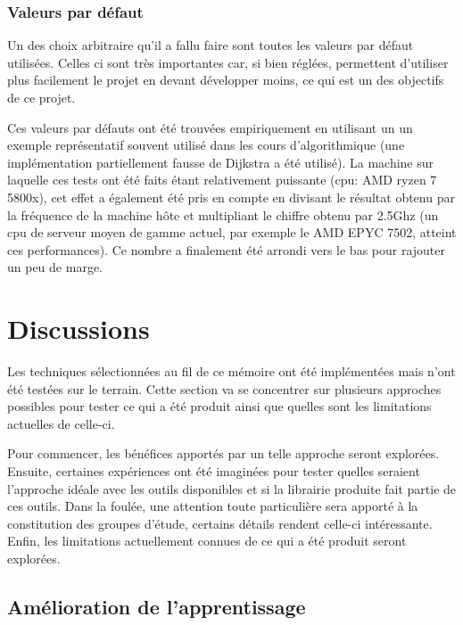 \documentclass[a4paper]{report}
\begin{document}
\subsection{Valeurs par défaut}
Un des choix arbitraire qu'il a fallu faire sont toutes les valeurs par défaut utilisées.
Celles ci sont très importantes car, si bien réglées, permettent d'utiliser plus facilement le projet en devant développer moins, ce qui est un des objectifs de ce projet.

Ces valeurs par défauts ont été trouvées empiriquement en utilisant un un exemple représentatif souvent utilisé dans les cours d'algorithmique (une implémentation partiellement fausse de Dijkstra a été utilisé).
La machine sur laquelle ces tests ont été faits étant relativement puissante (cpu: AMD ryzen 7 5800x), cet effet a également été pris en compte en divisant le résultat obtenu par la fréquence de la machine hôte et multipliant le chiffre obtenu par 2.5Ghz (un cpu de serveur moyen de gamme actuel, par exemple le AMD EPYC 7502, atteint ces performances).
Ce nombre a finalement été arrondi vers le bas pour rajouter un peu de marge.

\chapter{Discussions}

Les techniques sélectionnées au fil de ce mémoire ont été implémentées mais n'ont été testées sur le terrain.
Cette section va se concentrer sur plusieurs approches possibles pour tester ce qui a été produit ainsi que quelles sont les limitations actuelles de celle-ci.

Pour commencer, les bénéfices apportés par un telle approche seront explorées.
Ensuite, certaines expériences ont été imaginées pour tester quelles seraient l'approche idéale avec les outils disponibles et si la librairie produite fait partie de ces outils.
Dans la foulée, une attention toute particulière sera apporté à la constitution des groupes d'étude, certains détails rendent celle-ci intéressante.
Enfin, les limitations actuellement connues de ce qui a été produit seront explorées.

\section{Amélioration de l'apprentissage}
\end{document}
